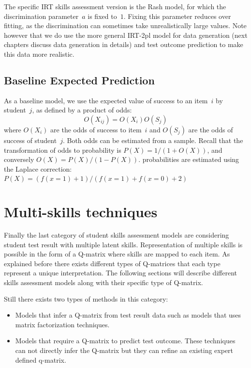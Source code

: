 The specific IRT skills assessment version is the Rash model, for which the discrimination parameter~$a$ is fixed to~$1$.  Fixing this parameter reduces over fitting, as the discrimination can sometimes take unrealistically large values. Note however that we do use the more general IRT-2pl model for data generation (next chapters discuss data generation in details) and test outcome prediction to make this data more realistic.


\subsection{Baseline Expected Prediction}

As a baseline model, we use the expected value of success to an item~$i$ by student~$j$, as defined by a product of odds:
\[ O(X_{ij}) =  O(X_i) O(S_j) \]
where $O(X_i)$ are the odds of success to item~$i$ and $O(S_j)$ are the odds of success of student~$j$.  Both odds can be estimated from a sample.  Recall that the transformation of odds to probability is $P(X) = 1/(1+O(X))$, and conversely $O(X) = P(X)/(1 - P(X))$. probabilities are estimated using the Laplace correction: $P(X) = (f(x\!=\!1) + 1) / (f(x\!=\!1) + f(x\!=\!0) + 2)$



\section{Multi-skills techniques}


Finally the last category of student skills assessment models are considering student test result with multiple latent skills. Representation of multiple skills is possible in the form of a Q-matrix where skills are mapped to each item. As explained before there exists different types of Q-matrices that each type represent a unique interpretation. The following sections will describe different skills assessment models along with their specific type of Q-matrix.


Still there exists two types of methods in this category: 
\begin{itemize}
\item Models that infer a Q-matrix from test result data such as models that uses matrix factorization techniques.
\item Models that require a Q-matrix to predict test outcome. These techniques can not directly infer the Q-matrix but they can refine an existing expert defined q-matrix.
\end{itemize}


